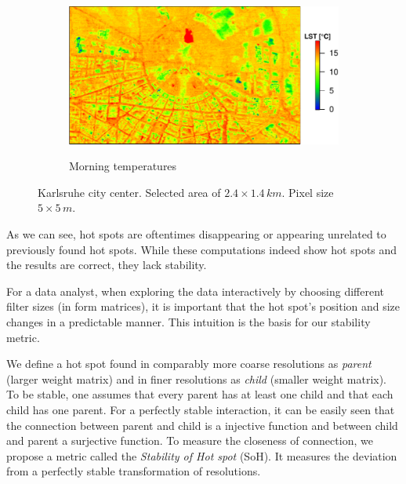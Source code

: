 \documentclass{itatnew}
\begin{document}
\begin{figure}[htp]
  \begin{subfigure}{1\linewidth}
    \caption{Morning temperatures}
    \includegraphics[width=\linewidth]{images/hotspot-rawtemp-1}
    \label{fig:TempMaps:a}
  \end{subfigure}
  
  \caption{
    Karlsruhe city center.
    Selected area of $2.4{\times}1.4\,km$.
    Pixel size $5{\times}5\,m$.
  }
  \label{fig:TempMaps}
\end{figure}

As we can see, hot spots are oftentimes disappearing or appearing unrelated to
previously found hot spots. While these computations indeed show hot spots and
the results are correct, they lack stability.

For a data analyst, when exploring the data interactively by choosing different
filter sizes (in form matrices), it is important that the hot spot's position
and size changes in a predictable manner. This intuition is the basis for our
stability metric.

We define a hot spot found in comparably more coarse resolutions as
\emph{parent} (larger weight matrix) and in finer resolutions as \emph{child}
(smaller weight matrix). To be stable, one assumes that every parent has at
least one child and that each child has one parent. For a perfectly stable
interaction, it can be easily seen that the connection between parent and child
is a injective function and between child and parent a surjective function. To
measure the closeness of connection, we propose a metric called the
\emph{Stability of Hot spot} (SoH). It measures the deviation from a perfectly
stable transformation of resolutions.
\end{document}

